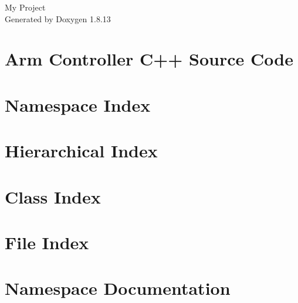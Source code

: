 \documentclass[twoside]{book}
\newcommand{\+}{\discretionary{\mbox{\scriptsize$\hookleftarrow$}}{}{}}
\newcommand{\clearemptydoublepage}{%
  \newpage{\pagestyle{empty}\cleardoublepage}%
}
\begin{document}
\hypersetup{pageanchor=false,
             bookmarksnumbered=true,
             pdfencoding=unicode
            }
\begin{titlepage}
\vspace*{7cm}
\begin{center}%
{\Large My Project }\\
\vspace*{1cm}
{\large Generated by Doxygen 1.8.13}\\
\end{center}
\end{titlepage}
\clearemptydoublepage
{}
\tableofcontents
\clearemptydoublepage
{}
\hypersetup{pageanchor=true}

\chapter{Arm Controller C++ Source Code}
\label{index}\hypertarget{index}{}
\chapter{Namespace Index}

\chapter{Hierarchical Index}

\chapter{Class Index}

\chapter{File Index}

\chapter{Namespace Documentation}



\end{document}
